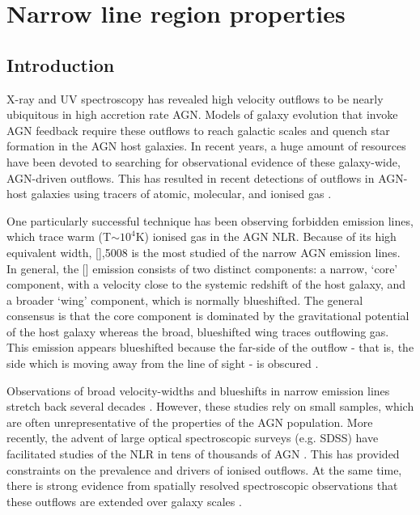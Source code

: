 
\chapter{Narrow line region properties}
\label{ch:nlr} 

\section{Introduction}

X-ray and UV spectroscopy has revealed high velocity outflows to be nearly ubiquitous in high accretion rate AGN.
Models of galaxy evolution that invoke AGN feedback require these outflows to reach galactic scales and quench star formation in the AGN host galaxies. 
In recent years, a huge amount of resources have been devoted to searching for observational evidence of these galaxy-wide, AGN-driven outflows. 
This has resulted in recent detections of outflows in AGN-host galaxies using tracers of atomic, molecular, and ionised gas \citep[e.g.][]{nesvadba06,arav08,nesvadba08,moe09,dunn10,alexander10,harrison12,harrison14,nesvadba10,rupke13,veilleux13,nardini15,feruglio10,alatalo11,cimatti13,cicone14}.  

One particularly successful technique has been observing forbidden emission lines, which trace warm (T$\sim$$10^4$K) ionised gas in the AGN NLR. 
Because of its high equivalent width, [],5008 is the most studied of the narrow AGN emission lines. 
In general, the [] emission consists of two distinct components: a narrow, `core' component, with a velocity close to the systemic redshift of the host galaxy, and a broader `wing' component, which is normally blueshifted. 
The general consensus is that the core component is dominated by the gravitational potential of the host galaxy whereas the broad, blueshifted wing traces outflowing gas. 
This emission appears blueshifted because the far-side of the outflow - that is, the side which is moving away from the line of sight - is obscured \citep[e.g.][]{heckman81,vrtilek85}. 

Observations of broad velocity-widths and blueshifts in narrow emission lines stretch back several decades \citep[e.g.][]{weedman70,stockton76,heckman81,veron81,feldman82,heckman84,vrtilek85,whittle85,boroson92}. 
However, these studies rely on small samples, which are often unrepresentative of the properties of the AGN population. 
More recently, the advent of large optical spectroscopic surveys (e.g. SDSS) have facilitated studies of the NLR in tens of thousands of AGN \citep[e.g.][]{boroson05,greene05a,zhang11,mullaney13,zakamska14,shen14}. 
This has provided constraints on the prevalence and drivers of ionised outflows.   
At the same time, there is strong evidence from spatially resolved spectroscopic observations that these outflows are extended over galaxy scales \citep[e.g.][]{greene09,greene11,hainline13,harrison12,harrison14}. 

